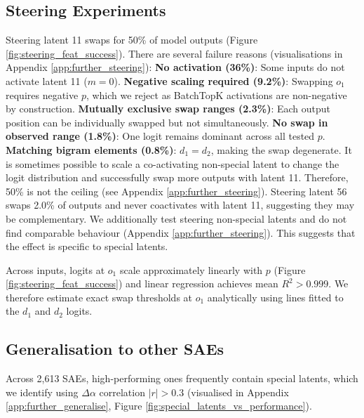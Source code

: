 \subsection{Steering Experiments}\label{ss:steering_exp}

Steering latent 11 swaps for 50\% of model outputs (Figure \ref{fig:steering_feat_success}). There are several failure reasons (visualisations in Appendix \ref{app:further_steering}):
\textbf{No activation (36\%)}: Some inputs do not activate latent 11 ($m=0$).
\textbf{Negative scaling required (9.2\%)}: Swapping $o_1$ requires negative $p$, which we reject as BatchTopK activations are non-negative by construction.
\textbf{Mutually exclusive swap ranges (2.3\%)}: Each output position can be individually swapped but not simultaneously.
\textbf{No swap in observed range (1.8\%)}: One logit remains dominant across all tested $p$.
\textbf{Matching bigram elements (0.8\%)}: $d_1 = d_2$, making the swap degenerate.
It is sometimes possible to scale a co-activating non-special latent to change the logit distribution and successfully swap more outputs with latent 11. Therefore, 50\% is not the ceiling (see Appendix \ref{app:further_steering}).
Steering latent 56 swaps 2.0\% of outputs and never coactivates with latent 11, suggesting they may be complementary.
We additionally test steering non-special latents and do not find comparable behaviour (Appendix \ref{app:further_steering}). This suggests that the effect is specific to special latents.

Across inputs, logits at $o_1$ scale approximately linearly with $p$ (Figure \ref{fig:steering_feat_success}) and linear regression achieves mean $R^2>0.999$. We therefore estimate exact swap thresholds at $o_1$ analytically using lines fitted to the $d_1$ and $d_2$ logits.

\subsection{Generalisation to other SAEs}\label{ss:sae_generalisation}

Across 2,613 SAEs, high-performing ones frequently contain special latents, which we identify using $\Delta \alpha$ correlation $|r| > 0.3$ (visualised in Appendix \ref{app:further_generalise}, Figure \ref{fig:special_latents_vs_performance}).


